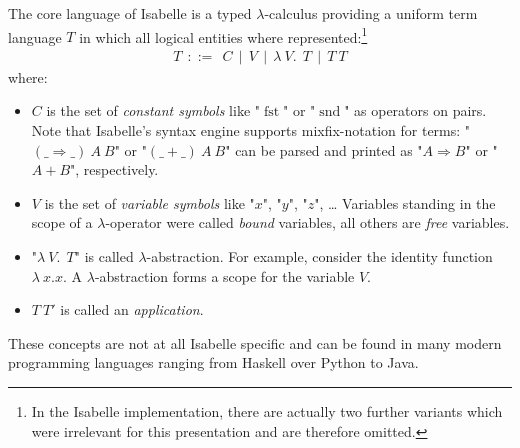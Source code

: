 The core language of Isabelle is a typed $\lambda$-calculus providing
a uniform term language $T$ in which all logical entities where
represented:\footnote{In the Isabelle implementation, there are
  actually two further variants which were irrelevant for this
  presentation and are therefore omitted.}
\begin{gather*}
   T~~ ::=~~ C~~ |~~ V ~~|~~ \lambda~V.~~ T ~~|~~ T~T
\end{gather*}
where:
\begin{itemize}
\item $C$ is the set of \emph{constant symbols}
      like "$\operatorname{fst}$" or "$\operatorname{snd}$" as operators on pairs. Note that
       Isabelle's syntax engine supports mixfix-notation for terms: 
       "$(\_ \Longrightarrow \_)~A~B$" or  "$(\_ + \_)~A~B$" 
       can be parsed and printed as 
       "$A \Longrightarrow B$" or  "$A + B$", respectively.
\item $V$ is the set of \emph{variable symbols} like "$x$", "$y$", "$z$", \ldots
      Variables standing in the scope of a $\lambda$-operator were called
      \emph{bound} variables, all others are \emph{free} variables.
\item "$\lambda~V.~~T$" is called $\lambda$-abstraction. For example, consider the
       identity function $\lambda~x. x$.
       A $\lambda$-abstraction forms a scope for the variable $V$.
\item $T~T'$ is called an \emph{application}.  
\end{itemize}
These concepts are not at all Isabelle specific and can be found in many modern programming
languages ranging from Haskell over Python to Java.

